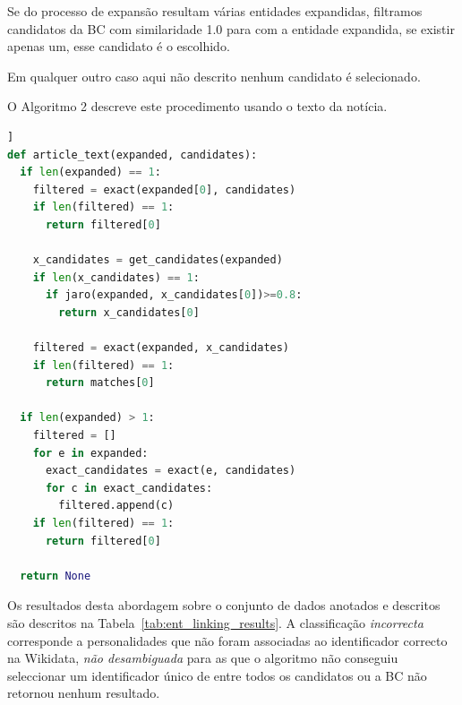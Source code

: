 \documentclass[a4paper, twocolumn, 11pt, twoside]{article}
\begin{document}
Se do processo de expansão resultam várias entidades expandidas, filtramos candidatos da BC com similaridade 1.0 para com a entidade expandida, se existir apenas um, esse candidato é o escolhido. 

Em qualquer outro caso aqui não descrito nenhum candidato é selecionado.

O Algoritmo 2 descreve este procedimento usando o texto da notícia.

\begin{lstlisting}[language=python,columns=fullflexible,frame=single,label={lst:alg2},title={Algoritmo 2. Ligação com a Wikidata usando o texto da notícia para expandir as entidades reconhecidas no título.},captionpos=b]]
def article_text(expanded, candidates):
  if len(expanded) == 1:
    filtered = exact(expanded[0], candidates)
	if len(filtered) == 1:
	  return filtered[0]
	  
    x_candidates = get_candidates(expanded)
    if len(x_candidates) == 1:
      if jaro(expanded, x_candidates[0])>=0.8:
        return x_candidates[0]
 
    filtered = exact(expanded, x_candidates)
    if len(filtered) == 1:
      return matches[0]
  
  if len(expanded) > 1:
    filtered = []
    for e in expanded:
      exact_candidates = exact(e, candidates)
	  for c in exact_candidates:
	    filtered.append(c)
    if len(filtered) == 1:
      return filtered[0]

  return None
\end{lstlisting}

Os resultados desta abordagem sobre o conjunto de dados anotados e descritos são descritos na Tabela~\ref{tab:ent_linking_results}. A classificação \textit{incorrecta} corresponde a personalidades que não foram associadas ao identificador correcto na Wikidata, \textit{não desambiguada} para as que o algoritmo não conseguiu seleccionar um identificador único de entre todos os candidatos ou a BC não retornou nenhum resultado.
\end{document}
